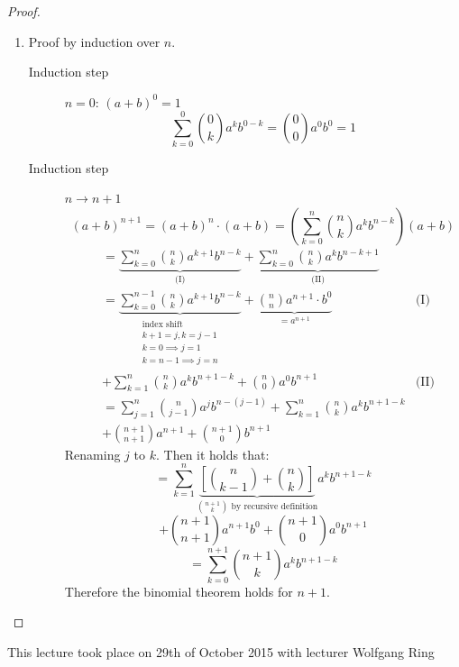 \documentclass[a4paper,landscape,twocolumn]{article}
\theoremstyle{definition}
\newcommand\meta[3]{\begin{mdframed}[skipbelow=4pt,skipabove=4pt,innermargin=1pt,innerleftmargin=1pt,innerrightmargin=1pt]\begin{center}\small{\textdownarrow{} This #1 took place on #2 with lecturer #3}\end{center}\end{mdframed}}
\begin{document}
\begin{proof}
  \begin{enumerate}
    \item
      Proof by induction over $n$.
      \begin{description}
        \item[Induction step] $n=0$: $(a + b)^0 = 1$
          \[ \sum_{k=0}^0 \binom{0}{k} a^k b^{0-k} = \binom{0}{0} a^0 b^0 = 1 \]
        \item[Induction step] $n \to n + 1$
          \[
            (a + b)^{n+1} = (a + b)^n \cdot (a + b)
            = \left(\sum_{k=0}^n \binom nk a^k b^{n-k}\right) (a + b)
          \]
          \begin{align*}
            &= \underbrace{\sum_{k=0}^n \binom nk a^{k+1} b^{n-k}}_{\text{(I)}} + \underbrace{\sum_{k=0}^n \binom nk a^k b^{n-k+1}}_{\text{(II)}} \\
            &= \underbrace{\sum_{k=0}^{n-1} \binom nk a^{k+1} b^{n-k}}_{\substack{\text{index shift} \\ k+1=j, k=j-1 \\ k=0 \implies j=1 \\ k=n-1 \implies j=n}} +
              \underbrace{\binom nn a^{n+1} \cdot b^0}_{= a^{n+1}} & \text{(I)} \\
            &+ \sum_{k=1}^n \binom nk a^k b^{n+1-k} + \binom n0 a^0 b^{n+1} & \text{(II)} \\
            &= \sum_{j=1}^n \binom{n}{j-1} a^j b^{n-(j-1)}
             + \sum_{k=1}^n \binom nk a^k b^{n+1-k} \\
            &+ \binom{n+1}{n+1} a^{n+1}
             + \binom{n+1}{0} b^{n+1}
          \end{align*}
          Renaming $j$ to $k$. Then it holds that:
          \[
            = \sum_{k=1}^n \underbrace{\left[\binom{n}{k-1} + \binom nk\right]}_{\binom{n+1}{k} \text{ by recursive definition}} a^k b^{n+1-k}
          \] \[
            + \binom{n+1}{n+1} a^{n+1} b^0
            + \binom{n+1}{0} a^0 b^{n+1}
          \] \[
            = \sum_{k=0}^{n+1} \binom{n+1}{k} a^k b^{n+1-k}
          \]
          Therefore the binomial theorem holds for $n+1$.
      \end{description}
  \end{enumerate}
\end{proof}

\meta{lecture}{29th of October 2015}{Wolfgang Ring}
\end{document}
